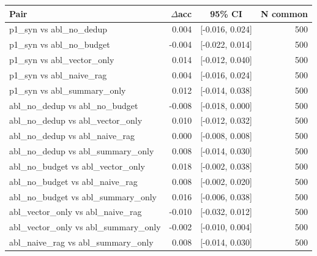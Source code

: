 \begin{tabular}{lrcr}
\toprule
Pair & $\Delta$acc & 95\% CI & N common \\
\midrule
p1_syn vs abl_no_dedup & 0.004 & [-0.016, 0.024] & 500 \\
p1_syn vs abl_no_budget & -0.004 & [-0.022, 0.014] & 500 \\
p1_syn vs abl_vector_only & 0.014 & [-0.012, 0.040] & 500 \\
p1_syn vs abl_naive_rag & 0.004 & [-0.016, 0.024] & 500 \\
p1_syn vs abl_summary_only & 0.012 & [-0.014, 0.038] & 500 \\
abl_no_dedup vs abl_no_budget & -0.008 & [-0.018, 0.000] & 500 \\
abl_no_dedup vs abl_vector_only & 0.010 & [-0.012, 0.032] & 500 \\
abl_no_dedup vs abl_naive_rag & 0.000 & [-0.008, 0.008] & 500 \\
abl_no_dedup vs abl_summary_only & 0.008 & [-0.014, 0.030] & 500 \\
abl_no_budget vs abl_vector_only & 0.018 & [-0.002, 0.038] & 500 \\
abl_no_budget vs abl_naive_rag & 0.008 & [-0.002, 0.020] & 500 \\
abl_no_budget vs abl_summary_only & 0.016 & [-0.006, 0.038] & 500 \\
abl_vector_only vs abl_naive_rag & -0.010 & [-0.032, 0.012] & 500 \\
abl_vector_only vs abl_summary_only & -0.002 & [-0.010, 0.004] & 500 \\
abl_naive_rag vs abl_summary_only & 0.008 & [-0.014, 0.030] & 500 \\
\bottomrule
\end{tabular}
